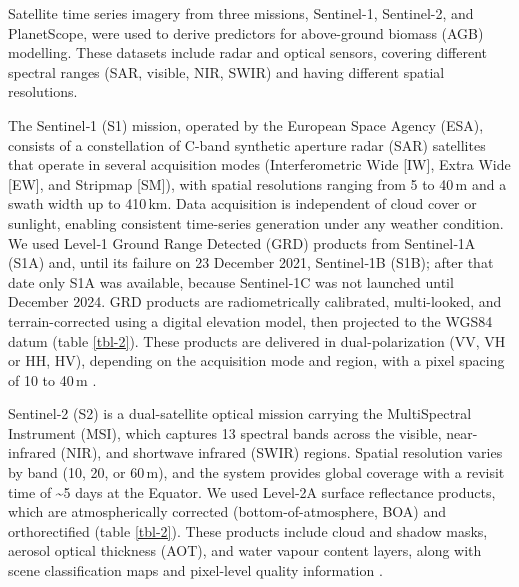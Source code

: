 \documentclass[
  british,
]{interact}
\begin{document}
Satellite time series imagery from three missions, Sentinel-1,
Sentinel-2, and PlanetScope, were used to derive predictors for
above-ground biomass (AGB) modelling. These datasets include radar and
optical sensors, covering different spectral ranges (SAR, visible, NIR,
SWIR) and having different spatial resolutions.

The Sentinel‑1 (S1) mission, operated by the European Space Agency
(ESA), consists of a constellation of C-band synthetic aperture radar
(SAR) satellites that operate in several acquisition modes
(Interferometric Wide {[}IW{]}, Extra Wide {[}EW{]}, and Stripmap
{[}SM{]}), with spatial resolutions ranging from 5 to 40\,m and a swath
width up to 410\,km. Data acquisition is independent of cloud cover or
sunlight, enabling consistent time-series generation under any weather
condition. We used Level‑1 Ground Range Detected (GRD) products from
Sentinel‑1A (S1A) and, until its failure on 23 December 2021,
Sentinel‑1B (S1B); after that date only S1A was available, because
Sentinel‑1C was not launched until December 2024. GRD products are
radiometrically calibrated, multi-looked, and terrain-corrected using a
digital elevation model, then projected to the WGS84 datum (table
\ref{tbl-2}). These products are delivered in dual-polarization (VV, VH
or HH, HV), depending on the acquisition mode and region, with a pixel
spacing of 10 to 40\,m \citep{Torres2012}.

Sentinel‑2 (S2) is a dual-satellite optical mission carrying the
MultiSpectral Instrument (MSI), which captures 13 spectral bands across
the visible, near-infrared (NIR), and shortwave infrared (SWIR) regions.
Spatial resolution varies by band (10, 20, or 60\,m), and the system
provides global coverage with a revisit time of \textasciitilde5 days at
the Equator. We used Level‑2A surface reflectance products, which are
atmospherically corrected (bottom-of-atmosphere, BOA) and orthorectified
(table \ref{tbl-2}). These products include cloud and shadow masks,
aerosol optical thickness (AOT), and water vapour content layers, along
with scene classification maps and pixel-level quality information
\citep{Drusch2012}.
\end{document}
